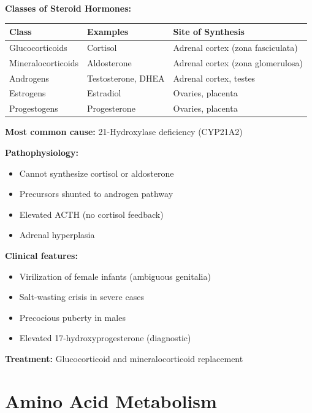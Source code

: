 \textbf{Classes of Steroid Hormones:}

\begin{center}
\begin{tabular}{lll}
\toprule
\textbf{Class} & \textbf{Examples} & \textbf{Site of Synthesis} \\
\midrule
Glucocorticoids & Cortisol & Adrenal cortex (zona fasciculata) \\
Mineralocorticoids & Aldosterone & Adrenal cortex (zona glomerulosa) \\
Androgens & Testosterone, DHEA & Adrenal cortex, testes \\
Estrogens & Estradiol & Ovaries, placenta \\
Progestogens & Progesterone & Ovaries, placenta \\
\bottomrule
\end{tabular}
\end{center}

\begin{tcolorbox}[colback=red!5, colframe=red!70!black, title=\textbf{Clinical Correlation: Congenital Adrenal Hyperplasia (CAH)}]
\textbf{Most common cause:} 21-Hydroxylase deficiency (CYP21A2)

\textbf{Pathophysiology:}
\begin{itemize}
    \item Cannot synthesize cortisol or aldosterone
    \item Precursors shunted to androgen pathway
    \item Elevated ACTH (no cortisol feedback)
    \item Adrenal hyperplasia
\end{itemize}

\textbf{Clinical features:}
\begin{itemize}
    \item Virilization of female infants (ambiguous genitalia)
    \item Salt-wasting crisis in severe cases
    \item Precocious puberty in males
    \item Elevated 17-hydroxyprogesterone (diagnostic)
\end{itemize}

\textbf{Treatment:} Glucocorticoid and mineralocorticoid replacement
\end{tcolorbox}

\section{Amino Acid Metabolism}

